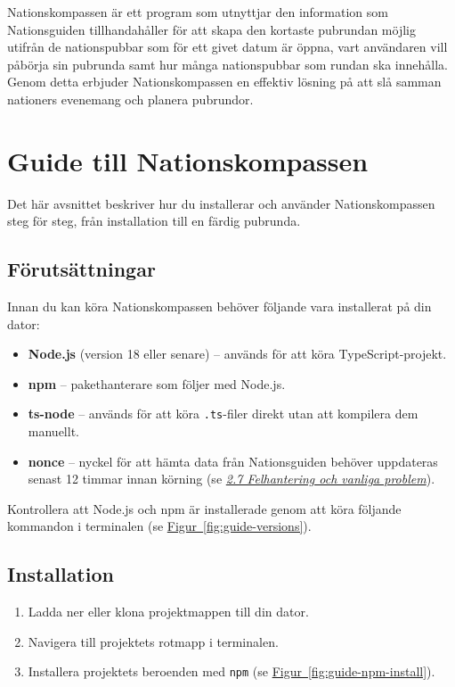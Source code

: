 \documentclass[a4paper, 12pt]{article}
\begin{document}
    Nationskompassen är ett program som utnyttjar den information som Nationsguiden tillhandahåller för att skapa den kortaste pubrundan möjlig utifrån de nationspubbar som för ett givet datum är öppna, vart användaren vill påbörja sin pubrunda samt hur många nationspubbar som rundan ska innehålla. Genom detta erbjuder Nationskompassen en effektiv lösning på att slå samman nationers evenemang och planera pubrundor.

\section{Guide till Nationskompassen}
\label{sec: guide}

    Det här avsnittet beskriver hur du installerar och använder Nationskompassen steg för steg, från installation till en färdig pubrunda.

    \subsection{Förutsättningar}

        Innan du kan köra Nationskompassen behöver följande vara installerat på din dator:

        \begin{itemize}
            \item \textbf{Node.js} (version 18 eller senare) -- används för att köra TypeScript-projekt.
            \item \textbf{npm} -- pakethanterare som följer med Node.js.
            \item \textbf{ts-node} -- används för att köra \texttt{.ts}-filer direkt utan att kompilera dem manuellt.
            \item \textbf{nonce} -- nyckel för att hämta data från Nationsguiden behöver uppdateras senast 12 timmar innan körning (se \hyperref[subsec: felhantering]{\textit{2.7 Felhantering och vanliga problem}}).
        \end{itemize}

        Kontrollera att Node.js och npm är installerade genom att köra följande kommandon i terminalen (se \hyperref[fig:guide-versions]{Figur~\ref*{fig:guide-versions}}).

    \subsection{Installation}

        \begin{enumerate}
            \item Ladda ner eller klona projektmappen till din dator.
            \item Navigera till projektets rotmapp i terminalen.
            \item Installera projektets beroenden med \texttt{npm} (se \hyperref[fig:guide-npm-install]{Figur~\ref*{fig:guide-npm-install}}).
        \end{enumerate}
\end{document}
